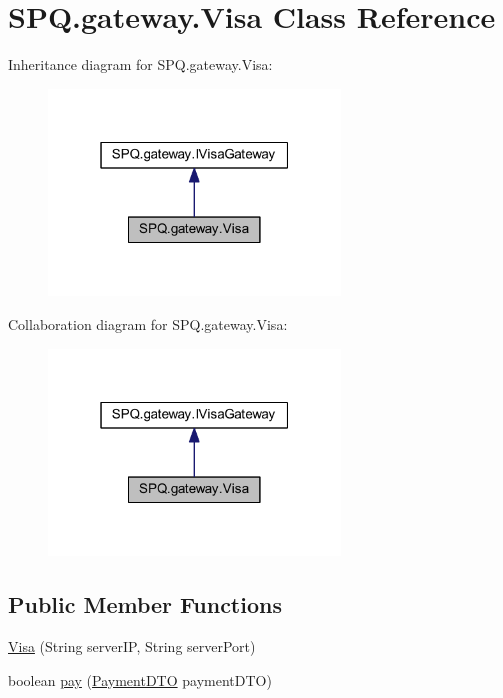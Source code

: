 \hypertarget{class_s_p_q_1_1gateway_1_1_visa}{}\section{S\+P\+Q.\+gateway.\+Visa Class Reference}
\label{class_s_p_q_1_1gateway_1_1_visa}


Inheritance diagram for S\+P\+Q.\+gateway.\+Visa\+:
\nopagebreak
\begin{figure}[H]
\begin{center}
\leavevmode
\includegraphics[width=220pt]{class_s_p_q_1_1gateway_1_1_visa__inherit__graph}
\end{center}
\end{figure}


Collaboration diagram for S\+P\+Q.\+gateway.\+Visa\+:
\nopagebreak
\begin{figure}[H]
\begin{center}
\leavevmode
\includegraphics[width=220pt]{class_s_p_q_1_1gateway_1_1_visa__coll__graph}
\end{center}
\end{figure}
\subsection*{Public Member Functions}
\begin{DoxyCompactItemize}
\item 
\mbox{\hyperlink{class_s_p_q_1_1gateway_1_1_visa_ae3db27f4e13da7b9d7d9496a1b5eeb91}{Visa}} (String server\+IP, String server\+Port)
\item 
boolean \mbox{\hyperlink{class_s_p_q_1_1gateway_1_1_visa_a0ecda0414a0685174ec12ae96c8d3a68}{pay}} (\mbox{\hyperlink{class_s_p_q_1_1dto_1_1_payment_d_t_o}{Payment\+D\+TO}} payment\+D\+TO)
\end{DoxyCompactItemize}


